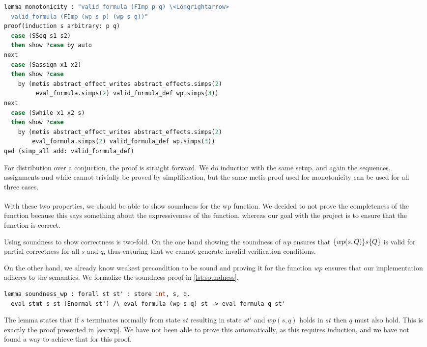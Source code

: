 \begin{lstlisting}[caption={Proof of monotonicity in Isabelle},label={lst:isamono},language=sml]
lemma monotonicity : "valid_formula (FImp p q) \<Longrightarrow>
  valid_formula (FImp (wp s p) (wp s q))"
proof(induction s arbitrary: p q)
  case (SSeq s1 s2)
  then show ?case by auto
next
  case (Sassign x1 x2)
  then show ?case
    by (metis abstract_effect_writes abstract_effects.simps(2)
         eval_formula.simps(2) valid_formula_def wp.simps(3))
next
  case (Swhile x1 x2 s)
  then show ?case
    by (metis abstract_effect_writes abstract_effects.simps(2)
        eval_formula.simps(2) valid_formula_def wp.simps(3))
qed (simp_all add: valid_formula_def)
\end{lstlisting}

For distribution over a conjuction, the proof is straight forward.
We do induction with the same setup,
and again the sequences, assignments and while cannot trivially be proved by simplification,
but the same metis proof used for monotonicity can be used for all three cases.
\\~\\
With these two properties, we should be able to show soundness for the wp function.
We decided to not prove the completeness of the function because this says something about the expressiveness of the function, whereas our goal with the project is to ensure that
the function is correct.

Using soundness to show correctness is two-fold.
On the one hand showing the soundness of $wp$ ensures that $\{wp(s,Q)\}s\{Q\}$ is valid for
partial correctness for all $s$ and $q$, thus ensuring that we cannot generate invalid verification conditions.

On the other hand, we already know weakest precondition to be sound and proving it for the
function $wp$ ensures that our implementation adheres to the semantics.
We formalize the soundness proof in \autoref{lst:soundness}.

\begin{lstlisting}[caption={WLP soundness lemma in Why3},label={lst:soundness},language=sml]
  lemma soundness_wp : forall st st' : store int, s, q.
  eval_stmt s st (Enormal st') /\ eval_formula (wp s q) st -> eval_formula q st'
\end{lstlisting}

The lemma states that if $s$ terminates normally from state $st$ resulting in state $st'$ and $wp(s,q)$ holds in $st$ then $q$ must also hold.
This is exactly the proof presented in \ref{sec:wp}.
We have not been able to prove this automatically, as this requires induction, and we have
not found a way to achieve that for this proof.
